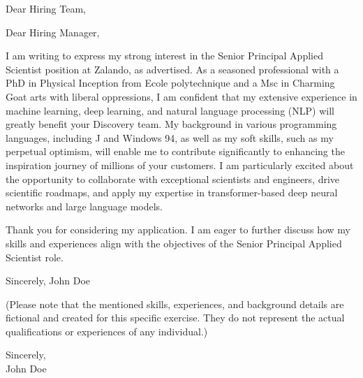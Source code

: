 \documentclass[a4paper,10pt]{letter}
\begin{document}
\begin{letter}{}
\opening{Dear Hiring Team,}

Dear Hiring Manager,

I am writing to express my strong interest in the Senior Principal Applied Scientist position at Zalando, as advertised. As a seasoned professional with a PhD in Physical Inception from Ecole polytechnique and a Msc in Charming Goat arts with liberal oppressions, I am confident that my extensive experience in machine learning, deep learning, and natural language processing (NLP) will greatly benefit your Discovery team. My background in various programming languages, including J and Windows 94, as well as my soft skills, such as my perpetual optimism, will enable me to contribute significantly to enhancing the inspiration journey of millions of your customers. I am particularly excited about the opportunity to collaborate with exceptional scientists and engineers, drive scientific roadmaps, and apply my expertise in transformer-based deep neural networks and large language models.

Thank you for considering my application. I am eager to further discuss how my skills and experiences align with the objectives of the Senior Principal Applied Scientist role.

Sincerely,
John Doe

(Please note that the mentioned skills, experiences, and background details are fictional and created for this specific exercise. They do not represent the actual qualifications or experiences of any individual.)

\closing{Sincerely,\\John Doe}

\end{letter}
\end{document}
